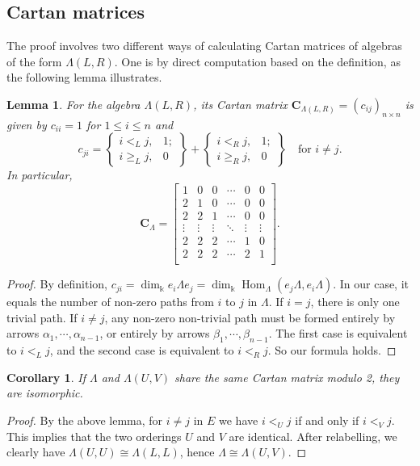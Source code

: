 \documentclass[11pt,reqno]{amsart}
\theoremstyle{plain}
\newtheorem{lemma}[theorem]{Lemma}
\newtheorem{corollary}[theorem]{Corollary}
\theoremstyle{definition}
\theoremstyle{remark}
\numberwithin{equation}{section}
\begin{document}
\subsection{Cartan matrices}
The proof involves two different ways of calculating Cartan matrices of algebras of the form $\Lambda(L,R)$. One is by direct computation based on the definition, as the following lemma illustrates.
\begin{lemma}\label{lem:Cartan matrix}
    For the algebra $\Lambda(L,R)$, its Cartan matrix $\mathbf{C}_{\Lambda(L,R)}=(c_{ij})_{n\times n}$ is given by $c_{ii}=1$ for $1\leq i\leq n$ and
    \[c_{ji}=\left\{\begin{array}{ll}
        i<_Lj, & 1; \\
        i\geq_Lj, & 0
    \end{array}\right\}+\left\{\begin{array}{ll}
        i<_Rj, & 1; \\
        i\geq_Rj, & 0
    \end{array}\right\}\quad\text{for $i\ne j$.}\]
    In particular,
    \[\mathbf{C}_\Lambda=\begin{bmatrix}
        1&0&0&\cdots&0&0\\
        2&1&0&\cdots&0&0\\
        2&2&1&\cdots&0&0\\
        \vdots&\vdots&\vdots&\ddots&\vdots&\vdots\\
        2&2&2&\cdots&1&0\\
        2&2&2&\cdots&2&1\\
    \end{bmatrix}.\]
\end{lemma}
\begin{proof}
    By definition, $c_{ji}=\dim_\Bbbk e_i\Lambda e_j=\dim_\Bbbk\mathop{\mathrm{Hom}}_\Lambda(e_j\Lambda,e_i\Lambda)$. In our case, it equals the number of non-zero paths from $i$ to $j$ in $\Lambda$. If $i=j$, there is only one trivial path. If $i\ne j$, any non-zero non-trivial path must be formed entirely by arrows $\alpha_1,\cdots,\alpha_{n-1}$, or entirely by arrows $\beta_1,\cdots,\beta_{n-1}$. The first case is equivalent to $i<_Lj$, and the second case is equivalent to $i<_Rj$. So our formula holds. 
\end{proof}
\begin{corollary}\label{lem:same Cartan => isomorphic}
    If $\Lambda$ and $\Lambda(U,V)$ share the same Cartan matrix modulo 2, they are isomorphic.
\end{corollary}
\begin{proof}
    By the above lemma, for $i\ne j$ in $E$ we have $i<_Uj$ if and only if $i<_Vj$. This implies that the two orderings $U$ and $V$ are identical. After relabelling, we clearly have $\Lambda(U,U)\cong\Lambda(L,L)$, hence $\Lambda\cong\Lambda(U,V)$.
\end{proof}
\end{document}
